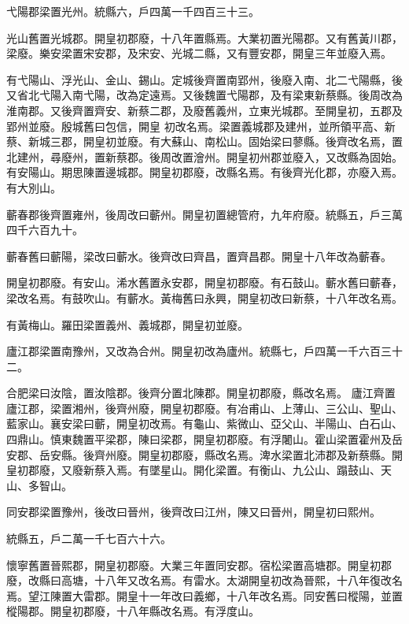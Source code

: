 \begin{pinyinscope}
 弋陽郡梁置光州。統縣六，戶四萬一千四百三十三。



 光山舊置光城郡。開皇初郡廢，十八年置縣焉。大業初置光陽郡。又有舊黃川郡，梁廢。樂安梁置宋安郡，及宋安、光城二縣，又有豐安郡，開皇三年並廢入焉。



 有弋陽山、浮光山、金山、錫山。定城後齊置南郢州，後廢入南、北二弋陽縣，後又省北弋陽入南弋陽，改為定遠焉。又後魏置弋陽郡，及有梁東新蔡縣。後周改為淮南郡。又後齊置齊安、新蔡二郡，及廢舊義州，立東光城郡。至開皇初，五郡及郢州並廢。殷城舊曰包信，開皇
 初改名焉。梁置義城郡及建州，並所領平高、新蔡、新城三郡，開皇初並廢。有大蘇山、南松山。固始梁曰蓼縣。後齊改名焉，置北建州，尋廢州，置新蔡郡。後周改置澮州。開皇初州郡並廢入，又改縣為固始。有安陽山。期思陳置邊城郡。開皇初郡廢，改縣名焉。有後齊光化郡，亦廢入焉。有大別山。



 蘄春郡後齊置雍州，後周改曰蘄州。開皇初置總管府，九年府廢。統縣五，戶三萬四千六百九十。



 蘄春舊曰蘄陽，梁改曰蘄水。後齊改曰齊昌，置齊昌郡。開皇十八年改為蘄春。



 開皇初郡廢。有安山。浠水舊置永安郡，開皇初郡廢。有石鼓山。蘄水舊曰蘄春，梁改名焉。有鼓吹山。有蘄水。黃梅舊曰永興，開皇初改曰新蔡，十八年改名焉。



 有黃梅山。羅田梁置義州、義城郡，開皇初並廢。



 廬江郡梁置南豫州，又改為合州。開皇初改為廬州。統縣七，戶四萬一千六百三十二。



 合肥梁曰汝陰，置汝陰郡。後齊分置北陳郡。開皇初郡廢，縣改名焉。
 廬江齊置廬江郡，梁置湘州，後齊州廢，開皇初郡廢。有冶甫山、上薄山、三公山、聖山、藍家山。襄安梁曰蘄，開皇初改焉。有龜山、紫微山、亞父山、半陽山、白石山、四鼎山。慎東魏置平梁郡，陳曰梁郡，開皇初郡廢。有浮闍山。霍山梁置霍州及岳安郡、岳安縣。後齊州廢。開皇初郡廢，縣改名焉。渒水梁置北沛郡及新蔡縣。開皇初郡廢，又廢新蔡入焉。有墜星山。開化梁置。有衡山、九公山、蹋鼓山、天山、多智山。



 同安郡梁置豫州，後改曰晉州，後齊改曰江州，陳又曰晉州，開皇初曰熙州。



 統縣五，戶二萬一千七百六十六。



 懷寧舊置晉熙郡，開皇初郡廢。大業三年置同安郡。宿松梁置高塘郡。開皇初郡廢，改縣曰高塘，十八年又改名焉。有雷水。太湖開皇初改為晉熙，十八年復改名焉。望江陳置大雷郡。開皇十一年改曰義鄉，十八年改名焉。同安舊曰樅陽，並置樅陽郡。開皇初郡廢，十八年縣改名焉。有浮度山。




\end{pinyinscope}
